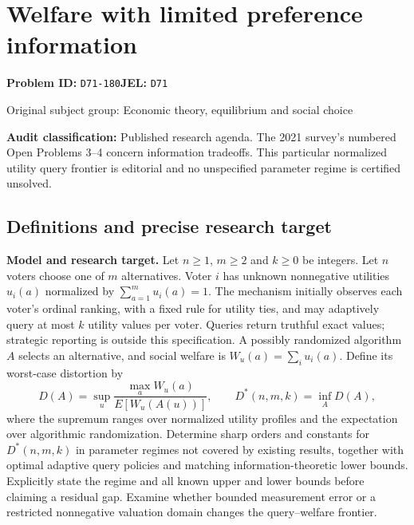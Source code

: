 \documentclass[11pt,a4paper]{article}
\begin{document}
\section*{Welfare with limited preference information}
\textbf{Problem ID:} \texttt{D71-180}\quad \textbf{JEL:} \texttt{D71}\par
\label{problem:OP-0279}
{\sffamily\small\color{muted}Original subject group: Economic theory, equilibrium and social choice\par}
\label{definitions:problem:30007561}
\textbf{Audit classification:} Published research agenda. The 2021 survey’s numbered Open Problems 3–4 concern information tradeoffs. This particular normalized utility query frontier is editorial and no unspecified parameter regime is certified unsolved.
\subsection*{Definitions and precise research target}
\textbf{Model and research target.} Let \(n\geq1\), \(m\geq2\) and \(k\geq0\) be integers. Let \(n\) voters choose one of \(m\) alternatives. Voter \(i\) has unknown nonnegative utilities \(u_i(a)\) normalized by \(\sum_{a=1}^m u_i(a)=1\). The mechanism initially observes each voter's ordinal ranking, with a fixed rule for utility ties, and may adaptively query at most \(k\) utility values per voter. Queries return truthful exact values; strategic reporting is outside this specification. A possibly randomized algorithm \(A\) selects an alternative, and social welfare is \(W_u(a)=\sum_i u_i(a)\). Define its worst-case distortion by
\[
 D(A)=\sup_u\frac{\max_a W_u(a)}{E[W_u(A(u))]},\qquad
 D^*(n,m,k)=\inf_A D(A),
\]
where the supremum ranges over normalized utility profiles and the expectation over algorithmic randomization. Determine sharp orders and constants for \(D^*(n,m,k)\) in parameter regimes not covered by existing results, together with optimal adaptive query policies and matching information-theoretic lower bounds. Explicitly state the regime and all known upper and lower bounds before claiming a residual gap. Examine whether bounded measurement error or a restricted nonnegative valuation domain changes the query–welfare frontier.
\end{document}
